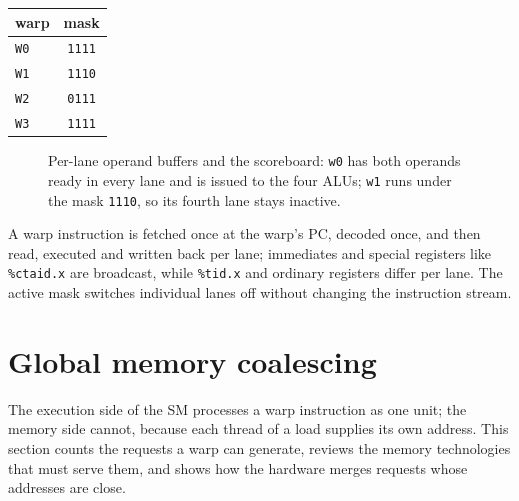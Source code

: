 \documentclass[../main.tex]{subfiles}
\begin{document}
\begin{margintable}
  \caption{Active masks for a later instruction (the walk-through above ran
    with all masks \texttt{1111}); lane~3 of \texttt{W1} and lane~0 of
    \texttt{W2} are switched off.}
  \label{tab:l04-masks}
  \begin{tabular}{lc}
    \toprule
    warp & mask \\
    \midrule
    \texttt{W0} & \texttt{1111} \\
    \texttt{W1} & \texttt{1110} \\
    \texttt{W2} & \texttt{0111} \\
    \texttt{W3} & \texttt{1111} \\
    \bottomrule
  \end{tabular}
\end{margintable}

\begin{figure}[htbp]
  \centering
  
  \caption{Per-lane operand buffers and the scoreboard: \texttt{w0}
    has both operands ready in every lane and is issued to the four
    ALUs; \texttt{w1} runs under the mask \texttt{1110}, so its fourth
    lane stays inactive.}
  \label{fig:l04-scoreboard-lanes}
\end{figure}


\begin{keypoint}
  A warp instruction is fetched once at the warp's PC, decoded once,
  and then read, executed and written back per lane; immediates and
  special registers like \texttt{\%ctaid.x} are broadcast, while
  \texttt{\%tid.x} and ordinary registers differ per lane.  The active
  mask switches individual lanes off without changing the instruction
  stream.
\end{keypoint}

\section{Global memory coalescing}
\label{sec:l04-coalescing}

The execution side of the SM processes a warp instruction as one unit;
the memory side cannot, because each thread of a load supplies its own
address.  This section counts the requests a warp can generate,
reviews the memory technologies that must serve them, and shows how the
hardware merges requests whose addresses are close.
\end{document}
